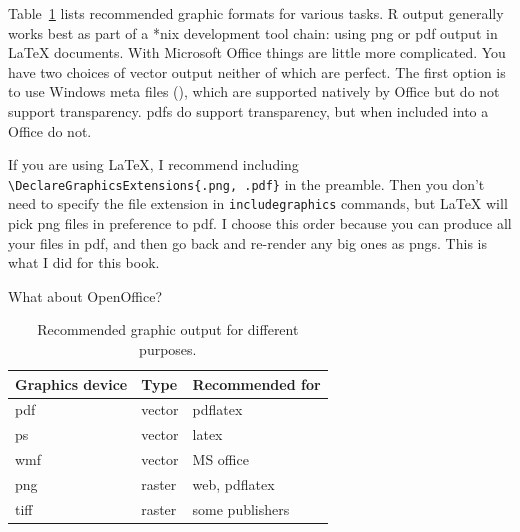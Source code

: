 Table~\ref{tbl:graphic-recommendation} lists recommended graphic formats for various tasks.  R output generally works best as part of a *nix development tool chain: using png or pdf output in \LaTeX{} documents.  With Microsoft Office things are little more complicated.  You have two choices of vector output neither of which are perfect.  The first option is to use Windows meta files (), which are supported natively by Office but do not support transparency.  {\sc pdf}s do support transparency, but when included into a Office do not.

If you are using \LaTeX, I recommend including \verb|\DeclareGraphicsExtensions{.png, .pdf}| in the preamble.  Then you don't need to specify the file extension in \verb|includegraphics| commands, but \LaTeX{} will pick png files in preference to pdf.  I choose this order because you can produce all your files in pdf, and then go back and re-render any big ones as pngs.  This is what I did for this book.

What about OpenOffice?

\begin{table}
  \begin{center}
  \begin{tabular}{lll}
    \toprule
    Graphics device & Type & Recommended for \\
    \midrule
    pdf   & vector & pdflatex\\
    ps    & vector & latex \\
    wmf   & vector & MS office \\
    png   & raster & web, pdflatex \\
    tiff  & raster & some publishers \\
    \bottomrule 
  \end{tabular}
  \end{center}
  \caption{Recommended graphic output for different purposes.}
  \label{tbl:graphic-recommendation}
\end{table}


